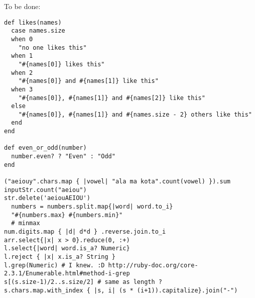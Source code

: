 \documentclass{a5charun}
\begin{document}
To be done:
\begin{verbatim}
def likes(names)
  case names.size
  when 0 
    "no one likes this"
  when 1 
    "#{names[0]} likes this"
  when 2
    "#{names[0]} and #{names[1]} like this"
  when 3
    "#{names[0]}, #{names[1]} and #{names[2]} like this"
  else
    "#{names[0]}, #{names[1]} and #{names.size - 2} others like this"
  end
end

def even_or_odd(number)
  number.even? ? "Even" : "Odd"
end

("aeiouy".chars.map { |vowel| "ala ma kota".count(vowel) }).sum
inputStr.count("aeiou")
str.delete('aeiouAEIOU')
  numbers = numbers.split.map{|word| word.to_i}
  "#{numbers.max} #{numbers.min}"
  # minmax
num.digits.map { |d| d*d } .reverse.join.to_i
arr.select{|x| x > 0}.reduce(0, :+)
l.select{|word| word.is_a? Numeric}
l.reject { |x| x.is_a? String }
l.grep(Numeric) # I knew. :D http://ruby-doc.org/core-2.3.1/Enumerable.html#method-i-grep
s[(s.size-1)/2..s.size/2] # same as length ?
s.chars.map.with_index { |s, i| (s * (i+1)).capitalize}.join("-")

\end{verbatim}
\end{document}
